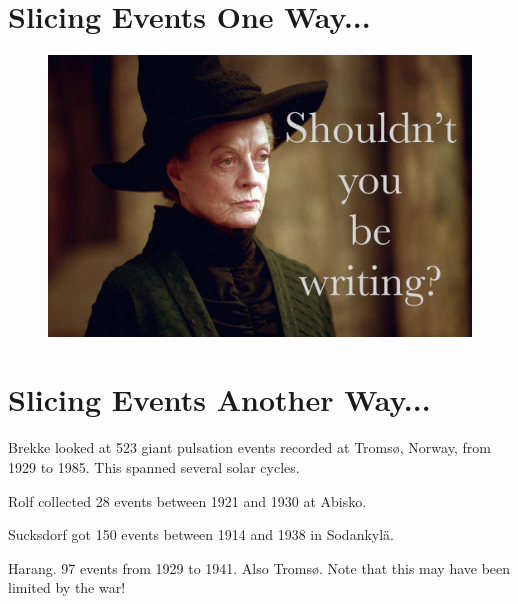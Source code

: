 \section{Slicing Events One Way...}

\begin{figure}[!htb]
    \centering
    \includegraphics[width=\textwidth]{figures/placeholder.jpg}
    \caption[Distribution of Events by Spectral Width]{
    }
    \label{fig_fwhm}
\end{figure}

\section{Slicing Events Another Way...}


Brekke\cite{brekke_1987} looked at 523 giant pulsation events recorded at Troms{\o}, Norway, from 1929 to 1985. This spanned several solar cycles. 

Rolf\cite{rolf_1931} collected 28 events between 1921 and 1930 at Abisko. 

Sucksdorf\cite{sucksdorff_1939} got 150 events between 1914 and 1938 in Sodankyl{\"a}. 

Harang\cite{harang_1941}. 97 events from 1929 to 1941. Also Troms{\o}. Note that this may have been limited by the war! 

